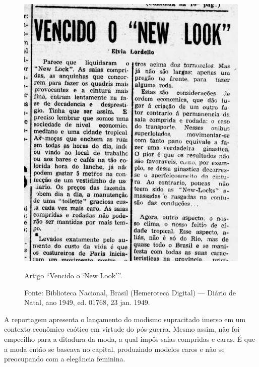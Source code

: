 \begin{refsection}
    \begin{figure}%
        \includegraphics[height=14\baselineskip]{articles/06-vencido-o-new-look-r/03-vencido-new-look.jpg}
        \hspace{\marginparsep}
        \begin{minipage}[b]{\marginparwidth}
            \caption{Artigo ``Vencido o `New Look'{}''.}
            \caption*{Fonte: Biblioteca Nacional, Brasil (Hemeroteca Digital) --- Diário de Natal, ano 1949, ed. 01768, 23 jan. 1949.}
            \label{fig:vencido-new-look}
        \end{minipage}
    \end{figure}%

    A reportagem apresenta o lançamento do modismo supracitado imerso em um contexto econômico caótico em virtude do pós-guerra. Mesmo assim, não foi empecilho para a ditadura da moda, a qual impôs saias compridas e caras. É que a moda então se baseava no capital, produzindo modelos caros e não se preocupando com a elegância feminina.


\end{refsection}
